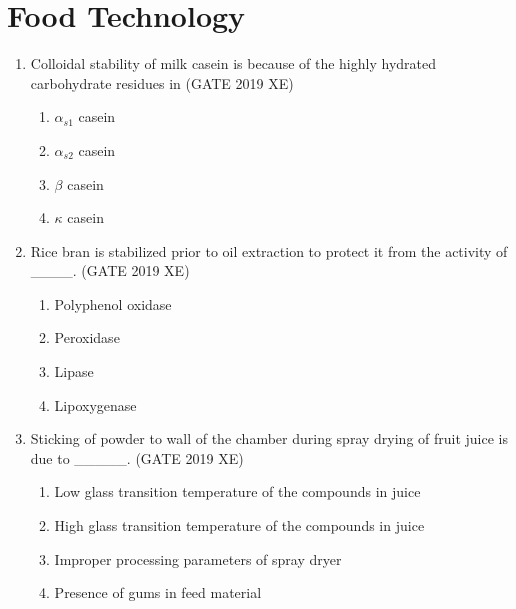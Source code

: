 \documentclass[journal,12pt,onecolumn]{IEEEtran}
\begin{document}
\section*{Food Technology}
\noindent
\bigskip
\begin{enumerate}

\item Colloidal stability of milk casein is because of the highly hydrated carbohydrate residues in
\hfill{(GATE 2019 XE)} \\
\begin{multicols}{2}
\begin{enumerate}
\item $\alpha_{s1}$ casein
\item $\alpha_{s2}$ casein
\item $\beta$ casein
\item $\kappa$ casein
\end{enumerate}
\end{multicols}


\item Rice bran is stabilized prior to oil extraction to protect it from the activity of \_\_\_\_.
\hfill{(GATE 2019 XE)} \\
\begin{multicols}{2}
\begin{enumerate}
\item Polyphenol oxidase
\item Peroxidase
\item Lipase
\item Lipoxygenase
\end{enumerate}
\end{multicols}

\item Sticking of powder to wall of the chamber during spray drying of fruit juice is due to \_\_\_\_\_.
\hfill{(GATE 2019 XE)} \\
\begin{multicols}{2}
\begin{enumerate}
\item Low glass transition temperature of the compounds in juice
\item High glass transition temperature of the compounds in juice
\item Improper processing parameters of spray dryer
\item Presence of gums in feed material
\end{enumerate}
\end{multicols}


\end{enumerate}
\end{document}
